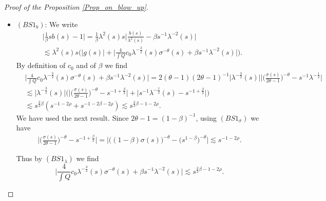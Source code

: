 \documentclass[16pt,english, oneside,reqno]{smfart}
\begin{document}
\begin{proof}[Proof of the Proposition \ref{Prop_on_blow_up}]
\begin{itemize}
\item $(BS1_b)$: We write
\begin{equation}
    \begin{split}
        &\Big\lvert \frac{1}{\beta}sb(s) -1 \Big\rvert = \frac{1}{\beta}\lambda^2(s)s \Big\lvert \frac{b(s)}{\lambda^2(s)} - \beta s^{-1}\lambda^{-2}(s)\Big\rvert \\
        &\lesssim \lambda^2(s)s \Bigg( \lvert g(s) \rvert + \Big\lvert \frac{4}{\int Q}c_0 \lambda^{-\frac{3}{2}}(s)\sigma^{-\theta}(s) + \beta s^{-1}\lambda^{-2}(s) \Big\rvert \Bigg) .
    \end{split}
\end{equation}
 By definition of $c_0$ and of $\beta$ we find
 \begin{equation}
 \begin{split}
     &\Big\lvert \frac{4}{\int Q}c_0 \lambda^{-\frac{3}{2}}(s)\sigma^{-\theta}(s) + \beta s^{-1}\lambda^{-2}(s) \Big\rvert  = 2(\theta-1)(2\theta-1)^{-1}\lvert \lambda^{-\frac{3}{2}}(s)\rvert \Bigg\lvert \Big( \frac{\sigma(s)}{2\theta-1} \Big)^{-\theta} - s^{-1}\lambda^{-\frac{1}{2}} \Bigg\rvert\\
     &\lesssim  \lvert \lambda^{-\frac{3}{2}}(s)\rvert \Bigg( \Big\lvert \Big( \frac{\sigma(s)}{2\theta-1} \Big)^{-\theta} - s^{-1+\frac{\beta}{2}} \Big\rvert +  \lvert s^{-1}\lambda^{-\frac{1}{2}}(s)- s^{-1+\frac{\beta}{2}} \rvert \Bigg)\\
     &\lesssim s^{\frac{3}{2}\beta}(s^{-1-2\rho}+ s^{-1-2\beta-2\rho}) \lesssim s^{\frac{3}{2}\beta-1-2\rho}.
\end{split}
 \end{equation}
We have used the next result. Since $2\theta-1 = (1-\beta)^{-1}$, using $(BS1_{\sigma})$ we have
 \begin{equation}
 \begin{split}
     \Bigg\lvert \Big( \frac{\sigma(s)}{2\theta-1} \Big)^{-\theta} - s^{-1+\frac{\beta}{2}} \Bigg\rvert = \Big\lvert \Big( (1-\beta)\sigma(s) \Big)^{-\theta} - \Big(s^{1-\beta}\Big)^{-\theta}\Big\rvert \lesssim s^{-1-2\rho}.
    \end{split}
 \end{equation}
 
Thus by $(BS1_\lambda)$ we find
\begin{equation}
    \Big\lvert \frac{4}{\int Q}c_0 \lambda^{-\frac{3}{2}}(s)\sigma^{-\theta}(s) + \beta s^{-1}\lambda^{-2}(s) \Big\rvert \lesssim s^{\frac{3}{2}\beta-1-2\rho}.
\end{equation}


\end{itemize}
\end{proof}
\end{document}
